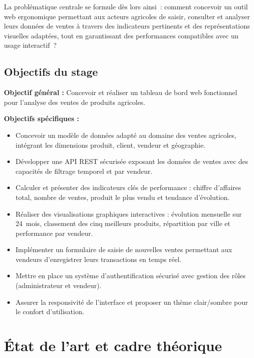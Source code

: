 \documentclass[11pt,a4paper]{report}
\begin{document}
La problématique centrale se formule dès lors ainsi~: comment concevoir un outil
web ergonomique permettant aux acteurs agricoles de saisir, consulter et
analyser leurs données de ventes à travers des indicateurs pertinents et des
représentations visuelles adaptées, tout en garantissant des performances
compatibles avec un usage interactif~?

\section{Objectifs du stage}
\label{sec:objectifs}
\textbf{Objectif général :} Concevoir et réaliser un tableau de bord web
fonctionnel pour l'analyse des ventes de produits agricoles.

\noindent\textbf{Objectifs spécifiques :}
\begin{itemize}
  \item Concevoir un modèle de données adapté au domaine des ventes agricoles,
        intégrant les dimensions produit, client, vendeur et géographie.
  \item Développer une API REST sécurisée exposant les données de ventes avec
        des capacités de filtrage temporel et par vendeur.
  \item Calculer et présenter des indicateurs clés de performance : chiffre
        d'affaires total, nombre de ventes, produit le plus vendu et tendance
        d'évolution.
  \item Réaliser des visualisations graphiques interactives : évolution
        mensuelle sur 24~mois, classement des cinq meilleurs produits,
        répartition par ville et performance par vendeur.
  \item Implémenter un formulaire de saisie de nouvelles ventes permettant aux
        vendeurs d'enregistrer leurs transactions en temps réel.
  \item Mettre en place un système d'authentification sécurisé avec gestion des
        rôles (administrateur et vendeur).
  \item Assurer la responsivité de l'interface et proposer un thème clair/sombre
        pour le confort d'utilisation.
\end{itemize}

\chapter{État de l'art et cadre théorique}
\label{chap:etat-art}
\end{document}
